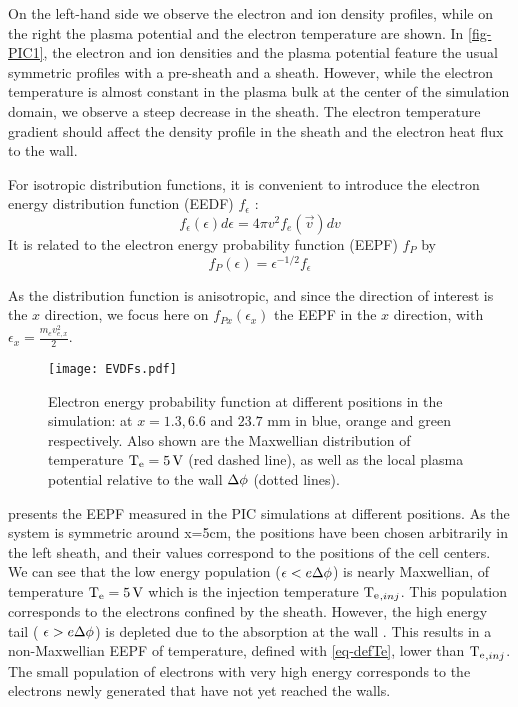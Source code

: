    On the left-hand side we observe the electron and ion density profiles, while on the right the plasma potential and the electron temperature are shown.
    In \cref{fig-PIC1}, the electron and ion densities and the plasma potential feature the usual symmetric profiles with a pre-sheath and a sheath.
    However, while the electron temperature is almost constant in the plasma bulk at the center of the simulation domain, we observe a steep decrease in the sheath.
    The electron temperature gradient should affect the density profile in the sheath and the electron heat flux to the wall.

    \vspace{1em}
    For isotropic distribution functions, it is convenient to introduce the electron energy distribution function (EEDF) $f_{\epsilon}$ \citep{chabert2011}:
    \begin{equation}
    f_{\epsilon}(\epsilon) d\epsilon = 4 \pi v^2 f_e(\vec{v}) dv
    \end{equation}
    It is related to the electron energy probability function (EEPF) $f_{P}$ by
    \begin{equation}
    f_{P}(\epsilon) = \epsilon^{-1/2} f_{\epsilon}
    \end{equation}

    As the distribution function is anisotropic, and since the direction of interest is the $x$ direction, we focus here on $f_{P x}(\epsilon_x)$ the EEPF in the $x$ direction, with $\epsilon_x = \frac{m_e v_{e,x}^2}{2}$.


    \begin{figure}[!htbp]
      \centering
      \texttt{[image: EVDFs.pdf]}
      \caption{Electron energy probability function at different positions in the simulation: at $x=1.3,6.6$ and $23.7$ mm in blue, orange and green respectively. Also shown are the Maxwellian distribution of temperature $\mathrm{T_e}=5{\mathrm{\,V}}$ (red dashed line), as well as the local plasma potential relative to the wall $\Delta \phi$ (dotted lines). }

      \label{fig-PIC2}
    \end{figure}

     presents the EEPF measured in the PIC simulations at different positions.
    As the system is symmetric around x=5cm, the positions have been chosen arbitrarily in the left sheath, and their values correspond to the positions of the cell centers.
    We can see that the low energy population ($\epsilon < e \Delta \phi$) is nearly Maxwellian, of temperature $\mathrm{T_e} = 5{\mathrm{\,V}}$ which is the injection temperature $\mathrm{T_e}_{, inj}$.
    This population corresponds to the electrons confined by the sheath.
    However, the high energy tail ( $\epsilon > e\Delta \phi$) is depleted due to the absorption at the wall \citep{meige2006a,kaganovich2007,lafleur2011}.
    This results in a  non-Maxwellian EEPF of temperature, defined with \cref{eq-defTe}, lower than $\mathrm{T_e}_{, inj}$.
    The small population of electrons with very high energy corresponds to the electrons newly generated that have not yet reached the walls.



